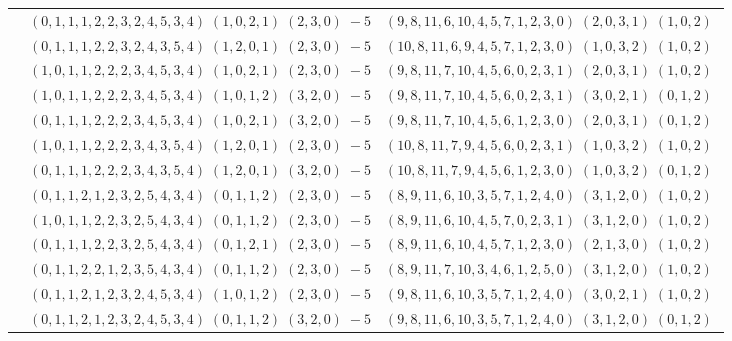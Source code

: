 \documentclass[11pt]{article}
\begin{document}
\begin{longtable}[l]{|c|c|c|}
 \cline{2-3} 
 & $(0 ,1 ,1 ,1 ,2 ,2 ,3 ,2 ,4 ,5 ,3 ,4) \;(1 ,0 ,2 ,1) \;(2 ,3 ,0) \;-5$ & $(9 ,8 ,11 ,6 ,10 ,4 ,5 ,7 ,1 ,2 ,3 ,0) \;(2 ,0 ,3 ,1) \;(1 ,0 ,2) \;$\\ 
 \cline{2-3} 
 & $(0 ,1 ,1 ,1 ,2 ,2 ,3 ,2 ,4 ,3 ,5 ,4) \;(1 ,2 ,0 ,1) \;(2 ,3 ,0) \;-5$ & $(10 ,8 ,11 ,6 ,9 ,4 ,5 ,7 ,1 ,2 ,3 ,0) \;(1 ,0 ,3 ,2) \;(1 ,0 ,2) \;$\\ 
 \cline{2-3} 
 & $(1 ,0 ,1 ,1 ,2 ,2 ,2 ,3 ,4 ,5 ,3 ,4) \;(1 ,0 ,2 ,1) \;(2 ,3 ,0) \;-5$ & $(9 ,8 ,11 ,7 ,10 ,4 ,5 ,6 ,0 ,2 ,3 ,1) \;(2 ,0 ,3 ,1) \;(1 ,0 ,2) \;$\\ 
 \cline{2-3} 
 & $(1 ,0 ,1 ,1 ,2 ,2 ,2 ,3 ,4 ,5 ,3 ,4) \;(1 ,0 ,1 ,2) \;(3 ,2 ,0) \;-5$ & $(9 ,8 ,11 ,7 ,10 ,4 ,5 ,6 ,0 ,2 ,3 ,1) \;(3 ,0 ,2 ,1) \;(0 ,1 ,2) \;$\\ 
 \cline{2-3} 
 & $(0 ,1 ,1 ,1 ,2 ,2 ,2 ,3 ,4 ,5 ,3 ,4) \;(1 ,0 ,2 ,1) \;(3 ,2 ,0) \;-5$ & $(9 ,8 ,11 ,7 ,10 ,4 ,5 ,6 ,1 ,2 ,3 ,0) \;(2 ,0 ,3 ,1) \;(0 ,1 ,2) \;$\\ 
 \cline{2-3} 
 & $(1 ,0 ,1 ,1 ,2 ,2 ,2 ,3 ,4 ,3 ,5 ,4) \;(1 ,2 ,0 ,1) \;(2 ,3 ,0) \;-5$ & $(10 ,8 ,11 ,7 ,9 ,4 ,5 ,6 ,0 ,2 ,3 ,1) \;(1 ,0 ,3 ,2) \;(1 ,0 ,2) \;$\\ 
 \cline{2-3} 
 & $(0 ,1 ,1 ,1 ,2 ,2 ,2 ,3 ,4 ,3 ,5 ,4) \;(1 ,2 ,0 ,1) \;(3 ,2 ,0) \;-5$ & $(10 ,8 ,11 ,7 ,9 ,4 ,5 ,6 ,1 ,2 ,3 ,0) \;(1 ,0 ,3 ,2) \;(0 ,1 ,2) \;$\\ 
 \cline{2-3} 
 & $(0 ,1 ,1 ,2 ,1 ,2 ,3 ,2 ,5 ,4 ,3 ,4) \;(0 ,1 ,1 ,2) \;(2 ,3 ,0) \;-5$ & $(8 ,9 ,11 ,6 ,10 ,3 ,5 ,7 ,1 ,2 ,4 ,0) \;(3 ,1 ,2 ,0) \;(1 ,0 ,2) \;$\\ 
 \cline{2-3} 
 & $(1 ,0 ,1 ,1 ,2 ,2 ,3 ,2 ,5 ,4 ,3 ,4) \;(0 ,1 ,1 ,2) \;(2 ,3 ,0) \;-5$ & $(8 ,9 ,11 ,6 ,10 ,4 ,5 ,7 ,0 ,2 ,3 ,1) \;(3 ,1 ,2 ,0) \;(1 ,0 ,2) \;$\\ 
 \cline{2-3} 
 & $(0 ,1 ,1 ,1 ,2 ,2 ,3 ,2 ,5 ,4 ,3 ,4) \;(0 ,1 ,2 ,1) \;(2 ,3 ,0) \;-5$ & $(8 ,9 ,11 ,6 ,10 ,4 ,5 ,7 ,1 ,2 ,3 ,0) \;(2 ,1 ,3 ,0) \;(1 ,0 ,2) \;$\\ 
 \cline{2-3} 
 & $(0 ,1 ,1 ,2 ,2 ,1 ,2 ,3 ,5 ,4 ,3 ,4) \;(0 ,1 ,1 ,2) \;(2 ,3 ,0) \;-5$ & $(8 ,9 ,11 ,7 ,10 ,3 ,4 ,6 ,1 ,2 ,5 ,0) \;(3 ,1 ,2 ,0) \;(1 ,0 ,2) \;$\\ 
 \cline{2-3} 
 & $(0 ,1 ,1 ,2 ,1 ,2 ,3 ,2 ,4 ,5 ,3 ,4) \;(1 ,0 ,1 ,2) \;(2 ,3 ,0) \;-5$ & $(9 ,8 ,11 ,6 ,10 ,3 ,5 ,7 ,1 ,2 ,4 ,0) \;(3 ,0 ,2 ,1) \;(1 ,0 ,2) \;$\\ 
 \cline{2-3} 
 & $(0 ,1 ,1 ,2 ,1 ,2 ,3 ,2 ,4 ,5 ,3 ,4) \;(0 ,1 ,1 ,2) \;(3 ,2 ,0) \;-5$ & $(9 ,8 ,11 ,6 ,10 ,3 ,5 ,7 ,1 ,2 ,4 ,0) \;(3 ,1 ,2 ,0) \;(0 ,1 ,2) \;$\\ 

\end{longtable}
\end{document}

